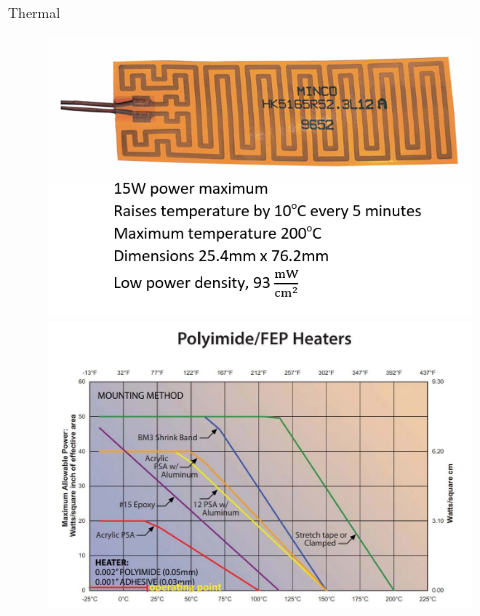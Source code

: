 \documentclass[11pt, aspectratio=169]{beamer}
\begin{document}
\begin{frame}[c]{Thermal}
    \begin{figure}[h!] 
 	\includegraphics[height=.7\textheight]{images/mincoheatingpad.png}
        \includegraphics[height=.7\textheight]{images/mountingmethod.png}
\end{figure}
\end{frame}
 
\end{document}
